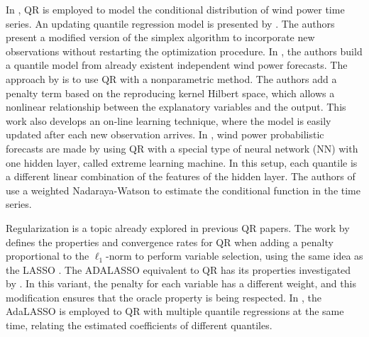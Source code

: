 %






In \cite{gallego2016line,moller_time-adaptive_2008,nielsen2006,bremnes_probabilistic_2004,wan_direct_2017}, QR is employed to model the conditional distribution of wind power time series.
An updating quantile regression model is presented by \cite{moller_time-adaptive_2008}. The authors present a modified version of the simplex algorithm to incorporate new observations without restarting the optimization procedure.
In \cite{nielsen2006}, the authors build a quantile model from already existent independent wind power forecasts.
The approach by \cite{gallego2016line} is to use QR with a nonparametric method. The authors add a penalty term based on the reproducing kernel Hilbert space, which allows a nonlinear relationship between the explanatory variables and the output. This work also develops an on-line learning technique, where the model is easily updated after each new observation arrives.
In \cite{wan_direct_2017}, wind power probabilistic forecasts are made by using QR with a special type of neural network (NN) with one hidden layer, called extreme learning machine. In this setup, each quantile is a different linear combination of the features of the hidden layer.
The authors of \cite{cai_regression_2002} use a weighted Nadaraya-Watson to estimate the conditional function in the time series.

Regularization is a topic already explored in previous QR papers.
The work by \cite{belloni_l1-penalized_2009} defines the properties and convergence rates for QR when adding a penalty proportional to the $\ell_1$-norm to perform variable selection, using the same idea as the LASSO \cite{tibshirani1996regression}. The ADALASSO equivalent to QR has its properties investigated by \cite{ciuperca_adaptive_2016}. In this variant, the penalty for each variable has a different weight, and this modification ensures that the oracle property is being respected. 
In \cite{zou_regularized_2008,jiang_interquantile_2014}, the AdaLASSO is employed to QR with multiple quantile regressions at the same time, relating the estimated coefficients of different quantiles.


